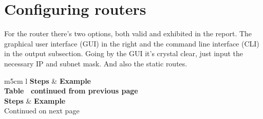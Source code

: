 \documentclass[11pt,a4paper]{report}
\begin{document}
    \section{Configuring routers}
        For the router there's two options, both valid and exhibited in the report. The graphical user interface (GUI) in the right and the command line interface (CLI) in the output subsection. Going by the GUI it's crystal clear, just input the necessary IP and subnet mask. And also the static routes.

        \begin{flushleft}
                \begin{center}
                    \begin{longtable}{ m{5cm} l }
                        \textbf{Steps} & \textbf{Example} \\
                        \hline
                        \endfirsthead
                        {{\bfseries Table \thetable\ continued from previous page}} \\
                        \textbf{Steps} & \textbf{Example} \\
                        \hline
                        \endhead
                        \hline Continued on next page \\
                        \endfoot
                        \endlastfoot


\end{longtable}
\end{center}
\end{flushleft}
\end{document}
